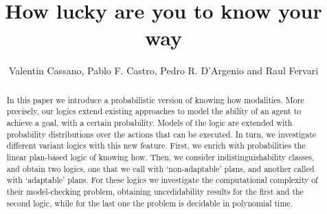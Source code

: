 \documentclass{article}
\begin{document}
\title{How lucky are you to know your way}
\author{Valentin Cassano, Pablo F. Castro, Pedro R. D'Argenio and Raul Fervari}
\date{}


\maketitle

\begin{abstract}
    In this paper we introduce a probabilistic version of knowing how modalities. More precisely, our logics extend existing approaches to model the ability of an agent to achieve a goal, with a certain probability. Models of the logic are extended with probability distributions over the actions that can be executed. In turn, we investigate different variant logics with this new feature. First, we enrich with probabilities the linear plan-based logic of knowing how. Then, we consider indistinguishability classes, and obtain two logics, one that we call with `non-adaptable' plans, and another called with `adaptable' plans. For these logics we investigate the computational complexity of their model-checking problem, obtaining uncedidability results for the first and the second logic, while for the last one the problem is decidable in polynomial time.
\end{abstract}










\end{document}
